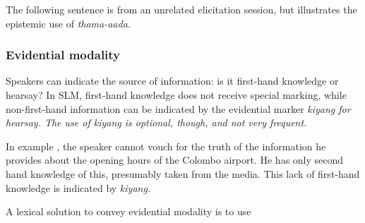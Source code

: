 
The following sentence is from an unrelated elicitation session, but illustrates the epistemic use of \em thama-aada\em.


\subsubsection[Evidential]{Evidential modality}\label{sec:func:Evidentialmodality}

Speakers can indicate  the source of  information: is it first-hand knowledge or hearsay?
In SLM, first-hand knowledge does not receive special marking, while non-first-hand information can be indicated by the evidential marker \em kiyang \em {} for hearsay. The use of \em kiyang \em is optional, though, and not very frequent.


In example , the speaker cannot vouch for the truth of the information he provides about the opening hours of the Colombo airport. He has only second hand knowledge of this, presumably taken from the media. This lack of first-hand knowledge is indicated by \em kiyang\em.

A lexical solution to convey evidential modality is to use 



